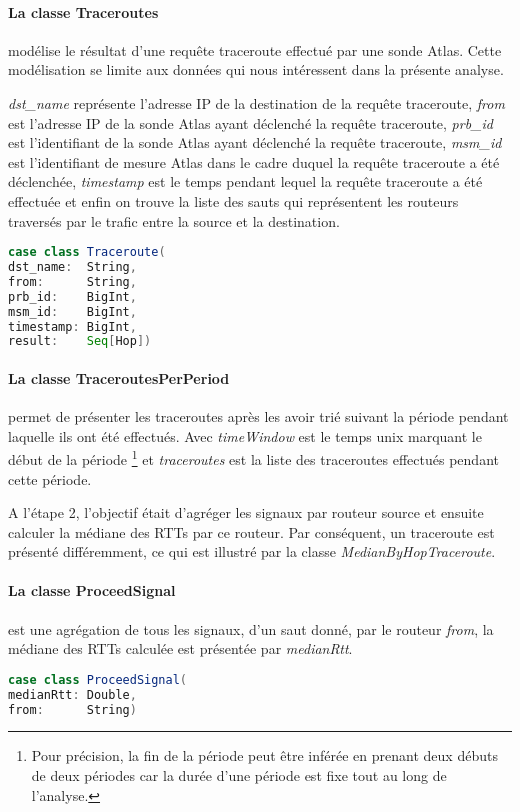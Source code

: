 \paragraph{La classe Traceroutes} modélise le résultat d'une requête traceroute effectué par une sonde Atlas. Cette modélisation se limite aux données qui nous intéressent dans la présente analyse. 

\textit{dst\_name} représente l'adresse IP de la destination de la requête traceroute, \textit{from} est l'adresse IP de la sonde Atlas ayant déclenché la requête traceroute, \textit{prb\_id} est l'identifiant de la sonde Atlas ayant déclenché la requête traceroute, \textit{msm\_id} est l'identifiant de mesure Atlas dans le cadre duquel la requête traceroute a été déclenchée, \textit{timestamp} est le temps pendant lequel la requête traceroute a été effectuée et enfin on trouve la liste des sauts qui représentent les routeurs traversés par le trafic entre la source et la destination. 

\begin{lstlisting}[language=scala]
case class Traceroute(
dst_name:  String,
from:      String,
prb_id:    BigInt,
msm_id:    BigInt,
timestamp: BigInt,
result:    Seq[Hop])
\end{lstlisting}
\paragraph{La classe TraceroutesPerPeriod} permet de présenter les traceroutes après les avoir trié   suivant la période pendant laquelle ils ont été effectués.  Avec \textit{timeWindow} est le temps unix marquant le début de la période \footnote{Pour précision, la fin de la période peut être inférée en prenant deux débuts de deux périodes car la durée d'une période est fixe tout au long de l'analyse.} et  \textit{traceroutes} est la liste des traceroutes effectués pendant cette période. 


A l'étape 2, l'objectif était d'agréger  les signaux par routeur source et ensuite calculer la médiane des RTTs par ce routeur. Par conséquent, un traceroute est présenté différemment, ce qui est  illustré par la classe \textit{MedianByHopTraceroute}.

\paragraph{La classe ProceedSignal }  est une agrégation de tous les signaux, d'un saut donné, par le routeur \textit{from},  la médiane des RTTs calculée est présentée par \textit{medianRtt}.
\begin{lstlisting}[language=scala]
case class ProceedSignal(
medianRtt: Double,
from:      String)
\end{lstlisting}
